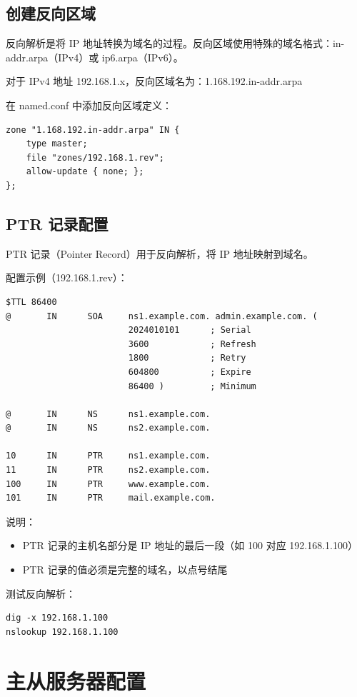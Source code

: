 \documentclass[12pt,UTF8]{ctexbook}
\begin{document}
\section{创建反向区域}
\label{sec:create_reverse_zone}

反向解析是将 IP 地址转换为域名的过程。反向区域使用特殊的域名格式：in-addr.arpa（IPv4）或 ip6.arpa（IPv6）。

对于 IPv4 地址 192.168.1.x，反向区域名为：1.168.192.in-addr.arpa

在 named.conf 中添加反向区域定义：
\begin{verbatim}
zone "1.168.192.in-addr.arpa" IN {
    type master;
    file "zones/192.168.1.rev";
    allow-update { none; };
};
\end{verbatim}

\section{PTR 记录配置}
\label{sec:ptr_record}

PTR 记录（Pointer Record）用于反向解析，将 IP 地址映射到域名。

配置示例（192.168.1.rev）：
\begin{verbatim}
$TTL 86400
@       IN      SOA     ns1.example.com. admin.example.com. (
                        2024010101      ; Serial
                        3600            ; Refresh
                        1800            ; Retry
                        604800          ; Expire
                        86400 )         ; Minimum

@       IN      NS      ns1.example.com.
@       IN      NS      ns2.example.com.

10      IN      PTR     ns1.example.com.
11      IN      PTR     ns2.example.com.
100     IN      PTR     www.example.com.
101     IN      PTR     mail.example.com.
\end{verbatim}

说明：
\begin{itemize}
    \item PTR 记录的主机名部分是 IP 地址的最后一段（如 100 对应 192.168.1.100）
    \item PTR 记录的值必须是完整的域名，以点号结尾
\end{itemize}

测试反向解析：
\begin{verbatim}
dig -x 192.168.1.100
nslookup 192.168.1.100
\end{verbatim}

\chapter{主从服务器配置}
\label{chap:master_slave}
\end{document}
